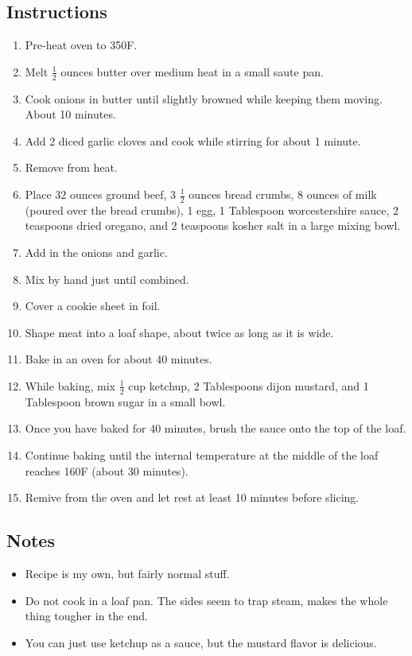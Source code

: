 \begin{multicols}{2}
\subsection*{Instructions}
\begin{enumerate}
    \item Pre-heat oven to 350F.
    \item Melt \( \frac{1}{2} \) ounces butter over medium heat in a small saute pan.
    \item Cook onions in butter until slightly browned while keeping them moving. About 10 minutes.
    \item Add 2 diced garlic cloves and cook while stirring for about 1 minute.
    \item Remove from heat.
    \item Place 32 ounces ground beef, 3 \( \frac{1}{2} \) ounces bread crumbs, 8 ounces of milk (poured over the bread crumbs), 1 egg, 1 Tablespoon worcestershire sauce, 2 teaspoons dried oregano, and 2 teaspoons kosher salt in a large mixing bowl.
    \item Add in the onions and garlic.
    \item Mix by hand just until combined.
    \item Cover a cookie sheet in foil.
    \item Shape meat into a loaf shape, about twice as long as it is wide.
    \item Bake in an oven for about 40 minutes.
    \item While baking, mix \( \frac{1}{2} \) cup ketchup, 2 Tablespoons dijon mustard, and 1 Tablespoon brown sugar in a small bowl.
    \item Once you have baked for 40 minutes, brush the sauce onto the top of the loaf.
    \item Continue baking until the internal temperature at the middle of the loaf reaches 160F (about 30 minutes).
    \item Remive from the oven and let rest at least 10 minutes before slicing.
\end{enumerate}

\subsection*{Notes}
\begin{itemize}
    \item Recipe is my own, but fairly normal stuff.
    \item Do not cook in a loaf pan. The sides seem to trap steam, makes the whole thing tougher in the end.
    \item You can just use ketchup as a sauce, but the mustard flavor is delicious.
\end{itemize}
\end{multicols}
\clearpage